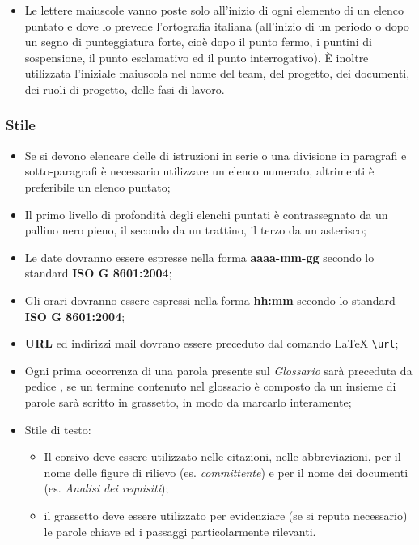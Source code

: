 \begin{itemize}

\item Le lettere maiuscole vanno poste solo all'inizio di ogni elemento di un elenco puntato e dove lo prevede l'ortografia italiana (all'inizio di un periodo o dopo un segno di punteggiatura forte, cioè dopo il punto fermo, i puntini di sospensione, il punto esclamativo ed il punto interrogativo). È inoltre utilizzata l'iniziale maiuscola nel nome del team, del progetto, dei documenti, dei ruoli di progetto, delle fasi di lavoro.


\end{itemize}

\subsubsection{Stile}
\begin{itemize}
\item Se si devono elencare delle di istruzioni in serie o una divisione in paragrafi e sotto-paragrafi è necessario utilizzare un elenco numerato, altrimenti è preferibile un elenco puntato;

\item Il primo livello di profondità degli elenchi puntati è contrassegnato da un pallino nero pieno, il secondo da un trattino, il terzo da un asterisco;

\item Le date dovranno essere espresse nella forma \textbf{aaaa-mm-gg} secondo lo standard  \textbf{ISO G 8601:2004};

\item Gli orari dovranno essere espressi nella forma \textbf{hh:mm} secondo lo standard \textbf{ISO G 8601:2004};

\item \textbf{URL} ed indirizzi mail dovrano essere preceduto dal comando \LaTeX{} \verb!\url!;

\item Ogni prima occorrenza di una parola presente sul \textit{Glossario} sarà preceduta da pedice , se un termine contenuto nel glossario è composto da un insieme di parole sarà scritto in grassetto, in modo da marcarlo interamente;

\item Stile di testo:

\begin{itemize}

\item Il corsivo deve essere utilizzato nelle citazioni, nelle abbreviazioni, per il nome delle figure di rilievo (es. \textit{committente}) e per il nome dei documenti (es. \textit{Analisi dei requisiti});

\item il grassetto deve essere utilizzato per evidenziare (se si reputa necessario) le parole chiave ed i passaggi particolarmente rilevanti.

\end{itemize}

\end{itemize}

